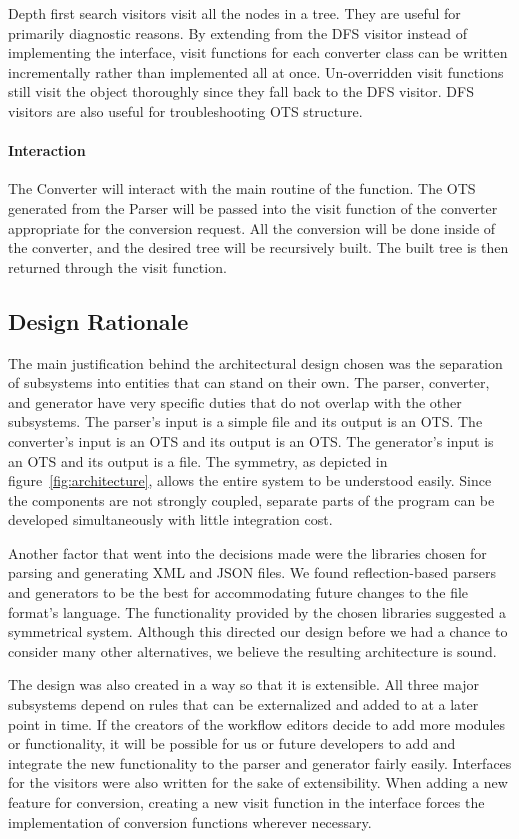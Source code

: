 \documentclass[12pt]{article}
\begin{document}
Depth first search visitors visit all the nodes in a tree. They are useful for primarily diagnostic reasons.  By extending from the DFS visitor instead of implementing the interface, visit functions for each converter class can be written incrementally rather than implemented all at once. Un-overridden visit functions still visit the object thoroughly since they fall back to the DFS visitor. DFS visitors are also useful for troubleshooting OTS structure.

\paragraph{Interaction}

The Converter will interact with the main routine of the function. The OTS generated from the Parser will be passed into the visit function of the converter appropriate for the conversion request. All  the conversion will be done inside of the converter, and the desired tree will be recursively built. The built tree is then returned through the visit function. 

\subsection{Design Rationale}
The main justification behind the architectural design chosen was the separation of subsystems into entities that can stand on their own. The parser, converter, and generator have very specific duties that do not overlap with the other subsystems. The parser's input is a simple file and its output is an OTS. The converter's input is an OTS and its output is an OTS. The generator's input is an OTS and its output is a file. The symmetry, as depicted in figure~\ref{fig:architecture}, allows the entire system to be understood easily.  Since the components are not strongly coupled, separate parts of the program can be developed simultaneously with little integration cost.

Another factor that went into the decisions made were the libraries chosen for parsing and generating XML and JSON files. We found reflection-based parsers and generators to be the best for accommodating future changes to the file format's language. The functionality provided by the chosen libraries suggested a symmetrical system. Although this directed our design before we had a chance to consider many other alternatives, we believe the resulting architecture is sound.

The design was also created in a way so that it is extensible. All three major subsystems depend on rules that can be externalized and added to at a later point in time. If the creators of the workflow editors decide to add more modules or functionality, it will be possible for us or future developers to add and integrate the new functionality to the parser and generator fairly easily. Interfaces for the visitors were also written for the sake of extensibility. When adding a new feature for conversion, creating a new visit function in the interface forces the implementation of conversion functions wherever necessary.
\end{document}
